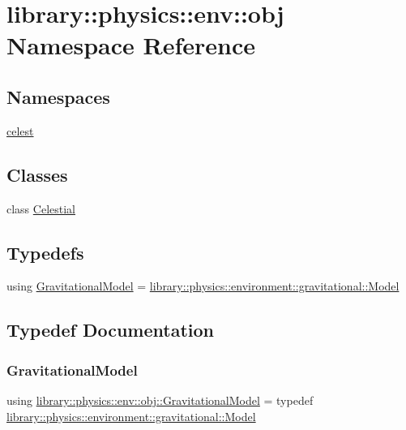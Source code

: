 \hypertarget{namespacelibrary_1_1physics_1_1env_1_1obj}{}\section{library\+:\+:physics\+:\+:env\+:\+:obj Namespace Reference}
\label{namespacelibrary_1_1physics_1_1env_1_1obj}
\subsection*{Namespaces}
\begin{DoxyCompactItemize}
\item 
 \hyperlink{namespacelibrary_1_1physics_1_1env_1_1obj_1_1celest}{celest}
\end{DoxyCompactItemize}
\subsection*{Classes}
\begin{DoxyCompactItemize}
\item 
class \hyperlink{classlibrary_1_1physics_1_1env_1_1obj_1_1_celestial}{Celestial}
\end{DoxyCompactItemize}
\subsection*{Typedefs}
\begin{DoxyCompactItemize}
\item 
using \hyperlink{namespacelibrary_1_1physics_1_1env_1_1obj_ade509c84a4970a3420c03c058ada152a}{Gravitational\+Model} = \hyperlink{classlibrary_1_1physics_1_1environment_1_1gravitational_1_1_model}{library\+::physics\+::environment\+::gravitational\+::\+Model}
\end{DoxyCompactItemize}


\subsection{Typedef Documentation}
\mbox{\label{namespacelibrary_1_1physics_1_1env_1_1obj_ade509c84a4970a3420c03c058ada152a}} 
\subsubsection{\texorpdfstring{Gravitational\+Model}{GravitationalModel}}
{\footnotesize\ttfamily using \hyperlink{namespacelibrary_1_1physics_1_1env_1_1obj_ade509c84a4970a3420c03c058ada152a}{library\+::physics\+::env\+::obj\+::\+Gravitational\+Model} = typedef \hyperlink{classlibrary_1_1physics_1_1environment_1_1gravitational_1_1_model}{library\+::physics\+::environment\+::gravitational\+::\+Model}}

